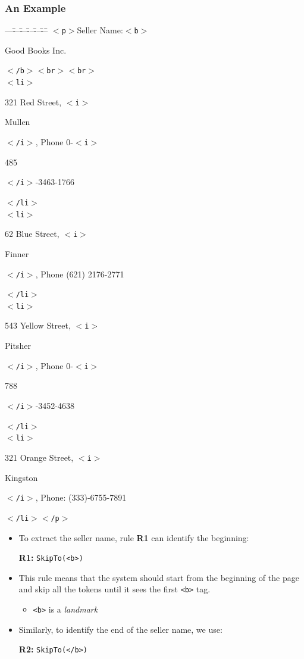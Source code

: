 \documentclass[svgnames]{beamer}
\newcounter{curtagcolor}
\newcommand{\xbtag}[1]{\textcolor{tagcolor!![\thecurtagcolor]}{$<$\texttt{#1}$>$}}
\newcommand{\xetag}[1]{\textcolor{tagcolor!![\thecurtagcolor]}{$<$\texttt{/#1}$>$}}
\newcommand{\xctag}[2]{\xbtag{#1}\addtocounter{curtagcolor}{1}#2\addtocounter{curtagcolor}{-1}\xetag{#1}}
\newenvironment{xml}{
  \begin{minipage}{.6\textwidth}
    \begin{tabbing}
      ---\=---\=---\=---\=---\=---\=\kill}{   
    \end{tabbing}
  \end{minipage}
}
\begin{document}

  



\begin{frame} \frametitle{An Example}
  
  \begin{exampleblock}{}
    \centering \scriptsize
    \begin{xml}
      \xbtag{p}Seller Name:\xctag{b}{Good Books Inc.}\xbtag{br}\xbtag{br}\\
      \xctag{li}{321 Red Street, \xctag{i}{Mullen}, Phone
        0-\xctag{i}{485}-3463-1766} \\
      \xctag{li}{62 Blue Street, \xctag{i}{Finner}, Phone
        (621) 2176-2771} \\
      \xctag{li}{543 Yellow Street, \xctag{i}{Pitsher}, Phone
        0-\xctag{i}{788}-3452-4638} \\
      \xctag{li}{321 Orange Street, \xctag{i}{Kingston}, Phone:
        (333)-6755-7891}\xetag{p}
    \end{xml}
  \end{exampleblock}

  \begin{itemize}
  \item To extract the seller name, rule \textbf{R1} can identify the
    beginning:
    \begin{center}
      \textbf{R1:} \texttt{SkipTo(<b>)}
    \end{center}
  \item This rule means that the system should start from the beginning of the
    page and skip all the tokens until it sees the first \texttt{<b>} tag.
    \begin{itemize}
    \item \texttt{<b>} is a \emph{landmark}
    \end{itemize}
  \item Similarly, to identify the end of the seller name, we use:
    \begin{center}
      \textbf{R2:} \texttt{SkipTo(</b>)}
    \end{center}
  \end{itemize}

\end{frame}
\end{document}
